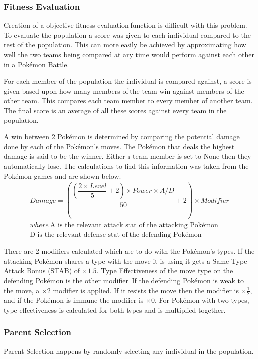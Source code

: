 \documentclass[a4paper]{article}
\newcommand{\Pokemon}{Pok\'{e}mon}
\begin{document}
\subsubsection{Fitness Evaluation}
\par
Creation of a objective fitness evaluation function is difficult with this problem.
To evaluate the population a score was given to each individual compared to the rest of the population.
This can more easily be achieved by approximating how well the two teams being compared at any time would perform against each other in a \Pokemon{} Battle.
\par
For each member of the population the individual is compared against, a score is given based upon how many members of the team win against members of the other team.
This compares each team member to every member of another team.
The final score is an average of all these scores against every team in the population.
\par
A win between 2 \Pokemon{} is determined by comparing the potential damage done by each of the \Pokemon{}'s moves.
The \Pokemon{} that deals the highest damage is said to be the winner.
Either a team member is set to None then they automatically lose.
The calculations to find this information was taken from the \Pokemon{} games and are shown below\cite{bulbapediaDamageCalcs}.
\begin{gather}
	Damage = \left( \dfrac {\left( \dfrac {2\times Level}{5}+2\right) \times Power \times A/D}{50}+2\right) \times Modifier
	\\
	where\ \text{A is the relevant attack stat of the attacking \Pokemon{}}
	\\ \text{D is the relevant defense stat of the defending \Pokemon{}}
\end{gather}
\par
There are 2 modifiers calculated which are to do with the \Pokemon{}'s types.
If the attacking \Pokemon{} shares a type with the move it is using it gets a Same Type Attack Bonus (STAB) of $\times 1.5$.
Type Effectiveness of the move type on the defending \Pokemon{} is the other modifier.
If the defending \Pokemon{} is weak to the move, a $\times 2$ modifier is applied.
If it resists the move then the modifier is $\times \frac{1}{2}$, and if the \Pokemon{} is immune the modifier is $\times 0$.
For \Pokemon{} with two types, type effectiveness is calculated for both types and is multiplied together.
\subsubsection{Parent Selection}
\par
Parent Selection happens by randomly selecting any individual in the population.
\end{document}
